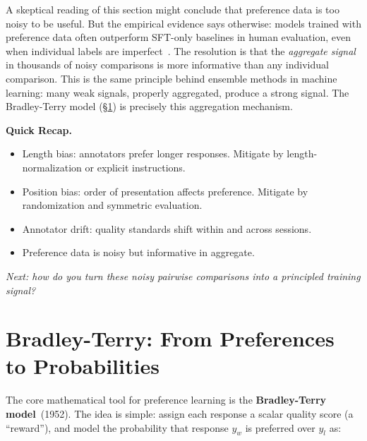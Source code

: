 \begin{tcolorbox}[colback=blue!5, colframe=blue!40, title=\textbf{Is Preference Data Just Vibes?}]
A skeptical reading of this section might conclude that preference data is too noisy to be useful. But the empirical evidence says otherwise: models trained with preference data often outperform SFT-only baselines in human evaluation, even when individual labels are imperfect~\cite{ouyang2022instructgpt, bai2022constitutional}. The resolution is that the \emph{aggregate signal} in thousands of noisy comparisons is more informative than any individual comparison. This is the same principle behind ensemble methods in machine learning: many weak signals, properly aggregated, produce a strong signal. The Bradley-Terry model (\S\ref{sec:bradley-terry}) is precisely this aggregation mechanism.
\end{tcolorbox}

\begin{quickrecap}
\textbf{Quick Recap.}
\begin{itemize}[nosep,leftmargin=1.5em]
  \item Length bias: annotators prefer longer responses. Mitigate by length-normalization or explicit instructions.
  \item Position bias: order of presentation affects preference. Mitigate by randomization and symmetric evaluation.
  \item Annotator drift: quality standards shift within and across sessions.
  \item Preference data is noisy but informative in aggregate.
\end{itemize}
\textit{Next: how do you turn these noisy pairwise comparisons into a principled training signal?}
\end{quickrecap}



\section{Bradley-Terry: From Preferences to Probabilities}
\label{sec:bradley-terry}

The core mathematical tool for preference learning is the \textbf{Bradley-Terry model}~(1952). The idea is simple: assign each response a scalar quality score (a ``reward''), and model the probability that response $y_w$ is preferred over $y_l$ as:

